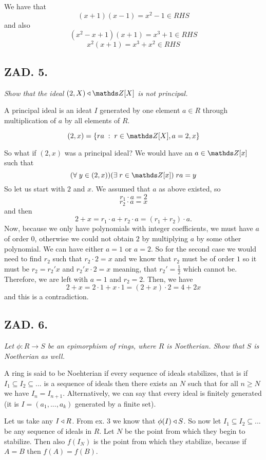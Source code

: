 \documentclass{article}[13pt]
\begin{document}
We have that 
$$(x+1)(x-1)=x^2-1\in RHS$$ 
and also 
$$(x^2-x+1)(x+1)=x^3+1\in RHS$$
$$x^2(x+1)=x^3+x^2\in RHS$$

\subsection*{ZAD. 5.}
\emph{Show that the ideal $(2, X)\dzielnat\Z[X]$ is not principal.}
\medskip

\medskip

A principal ideal is an ideat $I$ generated by one element $a\in R$ through multiplication of $a$ by all elements of $R$.
\smallskip

$$(2, x)=\{ra\;:\;r\in\Z[X],a=2,x\}$$

So what if $(2,x)$ was a principal ideal? We would have an $a\in\Z[x]$ such that 
$$(\forall\;y\in(2,x))(\exists\;r\in\Z[x])\;ra=y$$
So let us start with $2$ and $x$. We assumed that $a$ as above existed, so
$$r_1\cdot a=2$$
$$r_2\cdot a=x$$
and then
$$2+x=r_1\cdot a+r_2\cdot a=(r_1+r_2)\cdot a.$$
Now, because we only have polynomials with integer coefficients, we must have $a$ of order 0, otherwise we could not obtain $2$ by multiplying $a$ by some other polynomial. We can have either $a=1$ or $a=2$. So for the second case we would need to find $r_2$ such that $r_2\cdot2=x$ and we know that $r_2$ must be of order $1$ so it must be $r_2=r_2'x$ and $r_2'x\cdot 2=x$ meaning, that $r_2'=\frac12$ which cannot be. Therefore, we are left with $a=1$ and $r_2=2$. Then, we have
$$2+x=2\cdot 1+x\cdot 1=(2+x)\cdot 2=4+2x$$
and this is a contradiction.

\subsection*{ZAD. 6.}
\emph{Let $\phi:R\to S$ be an epimorphism of rings, where $R$ is Noetherian. Show that $S$ is Noetherian as well.}
\medskip

\medskip

A ring is said to be Noehterian if every sequence of ideals stabilizes, that is if $I_1\subseteq I_2\subseteq...$ is a sequence of ideals then there exists an $N$ such that for all $n\geq N$ we have $I_n=I_{n+1}$. Alternatively, we can say that every ideal is finitely generated (it is $I=(a_1,...,a_k)$ generated by a finite set).
\smallskip

Let us take any $I\triangleleft R$. From ex. 3 we know that $\phi(I)\triangleleft S$. So now let $I_1\subseteq I_2\subseteq ...$ be any sequence of ideals in $R$. Let $N$ be the point from which they begin to stabilize. Then also $f(I_N)$ is the point from which they stabilize, because if $A=B$ then $f(A)=f(B)$.
\smallskip
\end{document}
